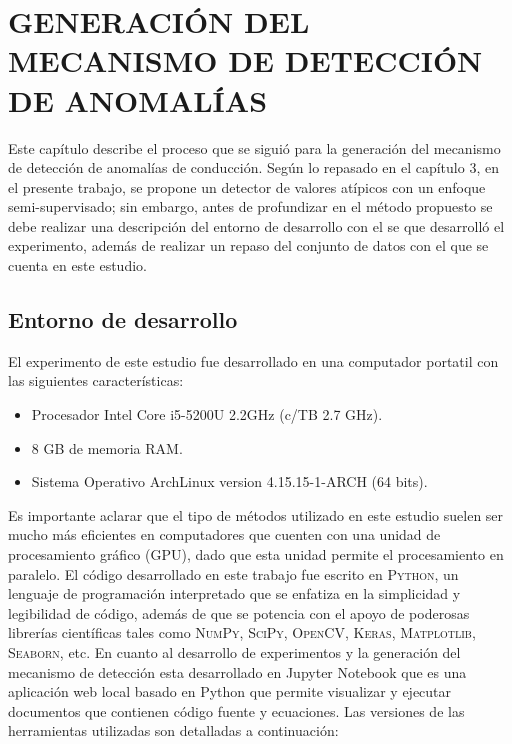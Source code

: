 \chapter{\uppercase{Generaci\'{o}n del mecanismo de detecci\'{o}n de anomal\'{i}as}}
\label{Capitulo 5}

Este cap\'{i}tulo describe el proceso que se sigui\'{o} para la generaci\'{o}n del mecanismo de detecci\'{o}n de anomal\'{i}as de conducci\'{o}n. Seg\'{u}n lo repasado en el cap\'{i}tulo 3, en el presente trabajo, se propone un detector de valores at\'{i}picos con un enfoque semi-supervisado; sin embargo, antes de profundizar en el m\'{e}todo propuesto se debe realizar una descripci\'{o}n del entorno de desarrollo con el se que desarroll\'{o} el experimento, adem\'{a}s de realizar un repaso del conjunto de datos con el que se cuenta en este estudio.

\section{Entorno de desarrollo}

El experimento de este estudio fue desarrollado en una computador portatil con las siguientes caracter\'{i}sticas:

\begin{itemize}
\item Procesador Intel Core i5-5200U 2.2GHz (c/TB 2.7 GHz).
\item 8 GB de memoria RAM.
\item Sistema Operativo ArchLinux version 4.15.15-1-ARCH (64 bits). 
\end{itemize}

Es importante aclarar que el tipo de m\'{e}todos utilizado en este estudio suelen ser mucho m\'{a}s eficientes en computadores que cuenten con una unidad de procesamiento gr\'{a}fico (GPU), dado que esta unidad permite el procesamiento en paralelo. El c\'{o}digo desarrollado en este trabajo fue escrito en \textsc{Python}, un lenguaje de programaci\'{o}n interpretado que se enfatiza en la simplicidad y legibilidad de c\'{o}digo, adem\'{a}s de que se potencia con el apoyo de poderosas librer\'{i}as cient\'{i}ficas tales como \textsc{NumPy}, \textsc{SciPy}, \textsc{OpenCV}, \textsc{Keras}, \textsc{Matplotlib}, \textsc{Seaborn}, etc. En cuanto al desarrollo de experimentos y la generaci\'{o}n del mecanismo de detecci\'{o}n esta desarrollado en Jupyter Notebook que es una aplicaci\'{o}n web local basado en Python que permite visualizar y ejecutar documentos que contienen c\'{o}digo fuente y ecuaciones. Las versiones de las herramientas utilizadas son detalladas a continuaci\'{o}n:

